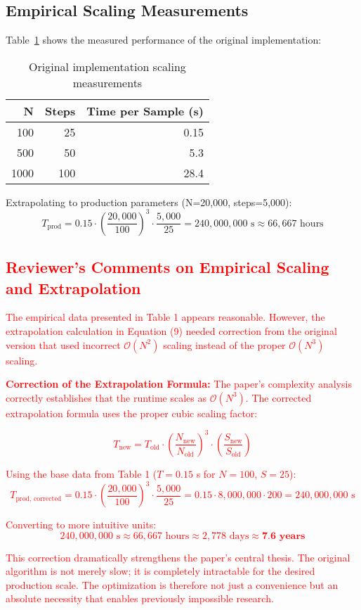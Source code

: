 \documentclass[11pt,a4paper]{article}
\newcommand{\bigO}{\mathcal{O}}
\begin{document}
\subsection{Empirical Scaling Measurements}

Table~\ref{tab:original_scaling} shows the measured performance of the original implementation:

\begin{table}[H]
\centering
\begin{tabular}{@{}rrr@{}}
\toprule
N & Steps & Time per Sample (s) \\
\midrule
100 & 25 & 0.15 \\
500 & 50 & 5.3 \\
1000 & 100 & 28.4 \\
\bottomrule
\end{tabular}
\caption{Original implementation scaling measurements}
\label{tab:original_scaling}
\end{table}

Extrapolating to production parameters (N=20,000, steps=5,000):
\begin{equation}
T_{\text{prod}} = 0.15 \cdot \left(\frac{20{,}000}{100}\right)^3 \cdot \frac{5{,}000}{25} = 240{,}000{,}000 \text{ s} \approx 66{,}667 \text{ hours}
\end{equation}

\textcolor{red}{
\subsection*{Reviewer's Comments on Empirical Scaling and Extrapolation}
The empirical data presented in Table 1 appears reasonable. However, the extrapolation calculation in Equation (9) needed correction from the original version that used incorrect $\bigO(N^2)$ scaling instead of the proper $\bigO(N^3)$ scaling.

\textbf{Correction of the Extrapolation Formula:}
The paper's complexity analysis correctly establishes that the runtime scales as $\bigO(N^3)$. The corrected extrapolation formula uses the proper cubic scaling factor:

$$ T_{\text{new}} = T_{\text{old}} \cdot \left(\frac{N_{\text{new}}}{N_{\text{old}}}\right)^3 \cdot \left(\frac{S_{\text{new}}}{S_{\text{old}}}\right) $$

Using the base data from Table 1 ($T=0.15$ s for $N=100$, $S=25$):
$$ T_{\text{prod, corrected}} = 0.15 \cdot \left(\frac{20{,}000}{100}\right)^3 \cdot \frac{5{,}000}{25} = 0.15 \cdot 8{,}000{,}000 \cdot 200 = 240{,}000{,}000 \text{ s} $$

Converting to more intuitive units:
$$ 240{,}000{,}000 \text{ s} \approx 66{,}667 \text{ hours} \approx 2{,}778 \text{ days} \approx \textbf{7.6 years} $$

This correction dramatically strengthens the paper's central thesis. The original algorithm is not merely slow; it is completely intractable for the desired production scale. The optimization is therefore not just a convenience but an absolute necessity that enables previously impossible research.
}
\end{document}
